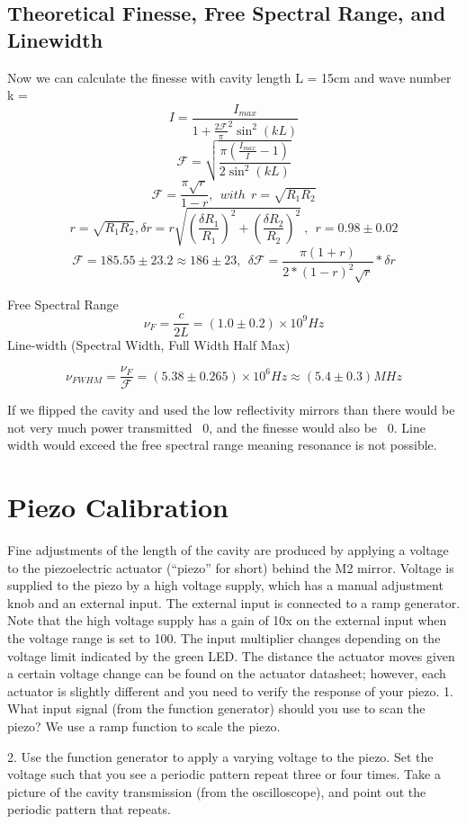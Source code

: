 \documentclass[11pt]{article}
\begin{document}
\subsection{Theoretical Finesse, Free Spectral Range, and Linewidth}

Now we can calculate the finesse with cavity length L = 15cm and wave number k = 
 $$I = \frac{I_{max}}{1 + \frac{2\mathscr{F}}{\pi}^2\sin^2(kL)} $$
 $$\mathscr{F} = \sqrt{ \frac{\pi(\frac{I_{max}}{I} - 1)}{2\sin^2(kL)}}$$
 $$\mathscr{F} = \frac{\pi\sqrt{r}}{1-r},\ \ with \ \ r = \sqrt{R_1R_2}$$
$$ r = \sqrt{R_1R_2}, \delta r = r \sqrt{(\frac{\delta R_1}{R_1})^2 + (\frac{\delta R_2}{R_2})^2}\ ,\ \  r = 0.98 \pm 0.02 $$ 
$$\mathscr{F} = 185.55 \pm 23.2 \approx 186 \pm 23 , \ \  \delta \mathscr{F} = \frac{\pi (1+r)}{2*(1-r)^2\sqrt{r}} * \delta r$$

Free Spectral Range
$$ \nu_F = \frac{c}{2L} = (1.0 \pm 0.2)\times 10^9 Hz $$
Line-width (Spectral Width, Full Width Half Max)

$$\nu_{FWHM} = \frac{\nu_F}{\mathscr{F}} = (5.38 \pm 0.265 )\times 10^6 Hz \approx (5.4\pm0.3)MHz $$

If we flipped the cavity and used the low reflectivity mirrors than there would be not very much power transmitted ~0, and the finesse would also be ~0. Line width would exceed the free spectral range meaning resonance is not possible. 

\section{Piezo Calibration}
Fine adjustments of the length of the cavity are produced by applying a voltage to the piezoelectric actuator (“piezo” for short) behind the M2 mirror. Voltage is supplied to the piezo by a high voltage supply, which has a manual adjustment knob and an external input. The external input is connected to a ramp generator. Note that the high voltage supply has a gain of 10x on the external input when the voltage range is set to 100. The input multiplier changes depending on the voltage limit indicated by the green LED. The distance the actuator moves given a certain voltage change can be found on the actuator datasheet; however, each actuator is slightly different and you need to verify the response of your piezo.
1. What input signal (from the function generator) should you use to scan the piezo?
We use a ramp function to scale the piezo.
	
2. Use the function generator to apply a varying voltage to the piezo. Set the voltage such that you see a periodic pattern repeat three or four times. Take a picture of the cavity transmission (from the oscilloscope), and point out the periodic pattern that repeats.
\end{document}
